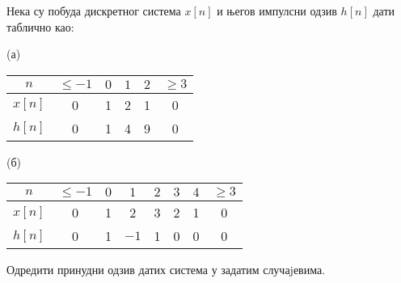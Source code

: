 \PID
Нека су побуда дискретног система $x[n]$ и његов импулсни одзив $h[n]$ дати таблично као:
\begin{center}
(а)
\begin{minipage}[c]{0.3\textwidth}
    \begin{tabular}{c||ccccc}
        \hline
        $n$ & $\leq-1$ & $0$ & $1$ & $2$ & $\geq 3$ \\ \hline
        $x[n]$ & 0 & 1 & 2 & 1 & 0 \\ \hline
        $h[n]$ & 0 & 1 & 4 & 9 & 0 \\ \hline
    \end{tabular}    
\end{minipage}
\qquad\qquad
(б)
\begin{minipage}[c]{0.4\textwidth}
    \begin{tabular}{c||ccccccc}
        \hline
        $n$ & $\leq-1$ & $0$ & $1$ & $2$ & $3$ & $4$ & $\geq 3$ \\ \hline
        $x[n]$ & 0 & 1 & 2 & 3 & 2 & 1 & 0 \\ \hline
        $h[n]$ & 0 & 1 & $-1$ & 1 & 0 & 0 & 0 \\ \hline
    \end{tabular}    
\end{minipage}
\hfill
\end{center}
Одредити принудни одзив датих система у задатим случаjевима.


